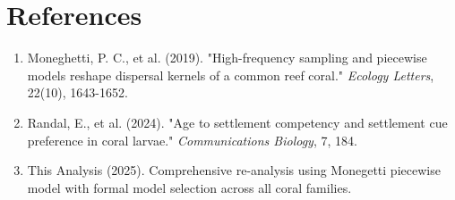 \documentclass[11pt]{article}
\begin{document}
\section{References}

\begin{enumerate}
    \item Moneghetti, P. C., et al. (2019). "High-frequency sampling and piecewise models reshape dispersal kernels of a common reef coral." \textit{Ecology Letters}, 22(10), 1643-1652.
    
    \item Randal, E., et al. (2024). "Age to settlement competency and settlement cue preference in coral larvae." \textit{Communications Biology}, 7, 184.
    
    \item This Analysis (2025). Comprehensive re-analysis using Monegetti piecewise model with formal model selection across all coral families.
\end{enumerate}
\end{document}
